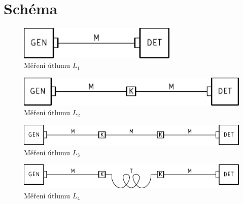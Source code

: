 \section*{Schéma}
  \begin{figure}[H]
    \centering
    \includegraphics[width=76mm]{../img/SCH1.pdf} %
    \caption{Měření útlumu $L_1$}
    \label{sch:1}
  \end{figure}
  
  \begin{figure}[H]
    \centering
    \includegraphics[width=122mm]{../img/SCH2.pdf} %
    \caption{Měření útlumu $L_2$}
    \label{sch:2}
  \end{figure}
  
  \begin{figure}[H]
    \centering
    \includegraphics[width=168mm]{../img/SCH3.pdf} %
    \caption{Měření útlumu $L_3$}
    \label{sch:2}
  \end{figure}
  
  \begin{figure}[H]
    \centering
    \includegraphics[width=168mm]{../img/SCH4.pdf} %
    \caption{Měření útlumu $L_4$}
    \label{sch:2}
  \end{figure}


